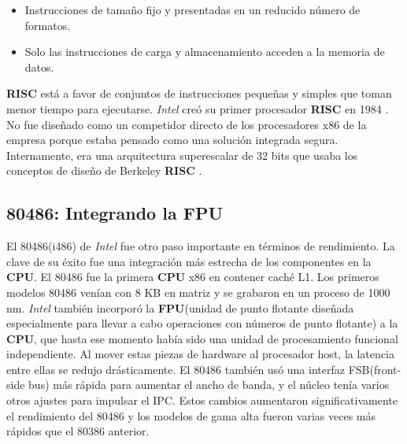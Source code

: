 \begin{itemize}
	\item Instrucciones de tamaño fijo y presentadas en un reducido número de formatos.
	\item Solo las instrucciones de carga y almacenamiento acceden a la memoria de datos.
\end{itemize}

\textbf{RISC} está a favor de conjuntos de instrucciones pequeñas y simples que toman menor tiempo para ejecutarse.
\emph{Intel} creó su primer procesador \textbf{RISC} en 1984 . No fue diseñado como un competidor directo de los procesadores 
x86 de la empresa porque estaba pensado como una solución integrada segura. Internamente, era una arquitectura superescalar de 32 bits que 
usaba los conceptos de diseño de Berkeley \textbf{RISC} .

\subsection{\textbf{80486}: Integrando la \textbf{FPU}}
El 80486(i486) de \emph{Intel} fue otro paso importante en términos de rendimiento. La clave de su éxito fue una integración más estrecha de los componentes 
en la \textbf{CPU}. El 80486 fue la primera \textbf{CPU} x86 en contener caché L1. Los primeros modelos 80486 venían con 8 KB en matriz y se grabaron en un proceso de 1000 nm.
\emph{Intel} también incorporó la \textbf{FPU}(unidad de punto flotante diseñada especialmente para llevar a cabo operaciones con números de punto flotante) a la \textbf{CPU}, que hasta ese 
momento había sido una unidad de procesamiento funcional independiente. Al mover estas piezas de hardware al procesador host, la latencia entre ellas se redujo 
drásticamente. El 80486 también usó una interfaz FSB(front-side bus) más rápida para aumentar el ancho de banda, y el núcleo 
tenía varios otros ajustes para impulsar el IPC. Estos cambios aumentaron significativamente el rendimiento del 80486 y los modelos de gama alta fueron varias 
veces más rápidos que el 80386 anterior. 


